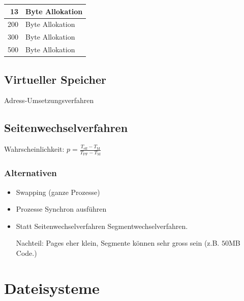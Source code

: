 \begin{tabular}{ | r | l |}
\hline
13 & Byte Allokation \\
\hline
200 & Byte Allokation \\
\hline
300 & Byte Allokation \\
\hline
500 & Byte Allokation \\
\hline
\end{tabular}

\subsection{Virtueller Speicher}

Adress-Umsetzungsverfahren

\subsection{Seitenwechselverfahren}

Wahrscheinlichkeit: $p=\frac{T_\text{eff}-T_\text{M}}{T_\text{PF}-T_\text{M}}$

\subsubsection{Alternativen}

\begin{itemize}
\item Swapping (ganze Prozesse)
\item Prozesse Synchron ausführen
\item Statt Seitenwechselverfahren Segmentwechselverfahren.

	Nachteil: Pages eher klein, Segmente können sehr gross sein (z.B. $50$MB Code.)
\end{itemize}

\section{Dateisysteme}



